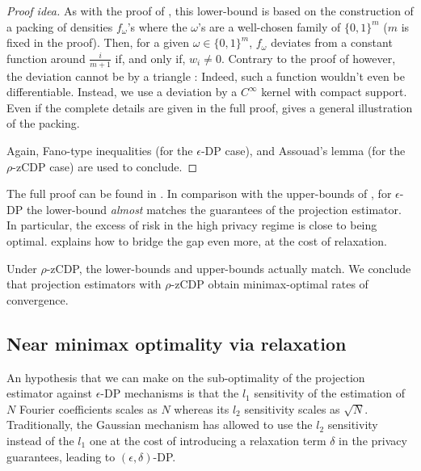 \documentclass[10pt]{article} %
\newcommand\RG[1]{\textcolor{red}{#1}}
\newcommand\mRG[1]{\marginpar{\tiny\RG{#1}}}
\begin{document}
\begin{proof}[Proof idea]
As with the proof of , this lower-bound is based on the construction of a packing of densities $f_{\omega}$'s where the $\omega$'s are a well-chosen family of $\{ 0, 1 \}^m$ ($m$ is fixed in the proof). Then, for a given  $\omega \in \{ 0, 1 \}^m$, $f_{\omega}$ deviates from a constant function around $\frac{i}{m+1}$ if, and only if, %
$w_i \neq 0$. 
Contrary to the proof of  however, the deviation cannot be by a triangle : Indeed, such a function wouldn't even be differentiable. Instead, we use a deviation by a $C^\infty$ kernel with compact support. Even if the complete details are given in the full proof,  gives a general illustration of the packing. 

Again, Fano-type inequalities (for the $\epsilon$-DP case), and Assouad's lemma (for the $\rho$-zCDP case) are used to conclude.
\end{proof}

The full proof can be found in .
In comparison with the upper-bounds of , for $\epsilon$-DP the lower-bound \emph{almost} matches the guarantees of the projection estimator. In particular, the excess of risk in the high privacy regime is close to being optimal.  explains how to bridge the gap even more, at the cost of relaxation. 

Under $\rho$-zCDP,  %
the lower-bounds and upper-bounds actually match. We conclude that projection estimators with $\rho$-zCDP obtain minimax-optimal rates of convergence.

\subsection{Near minimax optimality via relaxation}
\label{sec:relaxation}

An hypothesis that we can make on the sub-optimality of the projection estimator against $\epsilon$-DP mechanisms is that the $l_1$%
sensitivity of the estimation of $N$ Fourier coefficients scales as $N$ whereas its $l_2$ sensitivity scales as $\sqrt{N}$. Traditionally, the Gaussian mechanism \citep{dwork2006our,dwork2006calibrating} has allowed to use the $l_2$ sensitivity instead of the $l_1$ one at the cost of introducing a relaxation term $\delta$ in the privacy guarantees, leading to $(\epsilon, \delta)$-DP.
\end{document}
